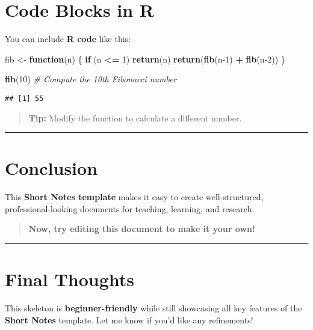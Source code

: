 \documentclass[
  14pt,
  a4paper,
]{extarticle}
\newenvironment{Shaded}{\begin{snugshade}}{\end{snugshade}}
\newcommand{\CommentTok}[1]{\textcolor[rgb]{0.56,0.35,0.01}{\textit{#1}}}
\newcommand{\ControlFlowTok}[1]{\textcolor[rgb]{0.13,0.29,0.53}{\textbf{#1}}}
\newcommand{\DecValTok}[1]{\textcolor[rgb]{0.00,0.00,0.81}{#1}}
\newcommand{\FunctionTok}[1]{\textcolor[rgb]{0.13,0.29,0.53}{\textbf{#1}}}
\newcommand{\NormalTok}[1]{#1}
\newcommand{\OtherTok}[1]{\textcolor[rgb]{0.56,0.35,0.01}{#1}}
\newcommand{\SpecialCharTok}[1]{\textcolor[rgb]{0.81,0.36,0.00}{\textbf{#1}}}
\begin{document}
\section{\texorpdfstring{ \textbf{Code Blocks in
R}}{ Code Blocks in R}}\label{code-blocks-in-r}

You can include \textbf{R code} like this:

\begin{Shaded}
\begin{Highlighting}[]
\NormalTok{fib }\OtherTok{\textless{}{-}} \ControlFlowTok{function}\NormalTok{(n) \{}
  \ControlFlowTok{if}\NormalTok{ (n }\SpecialCharTok{\textless{}=} \DecValTok{1}\NormalTok{) }\FunctionTok{return}\NormalTok{(n)}
  \FunctionTok{return}\NormalTok{(}\FunctionTok{fib}\NormalTok{(n}\DecValTok{{-}1}\NormalTok{) }\SpecialCharTok{+} \FunctionTok{fib}\NormalTok{(n}\DecValTok{{-}2}\NormalTok{))}
\NormalTok{\}}

\FunctionTok{fib}\NormalTok{(}\DecValTok{10}\NormalTok{) }\CommentTok{\# Compute the 10th Fibonacci number}
\end{Highlighting}
\end{Shaded}

\begin{verbatim}
## [1] 55
\end{verbatim}

\begin{quote}
 \textbf{Tip:} Modify the function to calculate a
different number.
\end{quote}

\begin{center}\rule{0.5\linewidth}{0.5pt}\end{center}

\section{\texorpdfstring{
\textbf{Conclusion}}{ Conclusion}}\label{conclusion}

This \textbf{Short Notes template} makes it easy to create
well-structured, professional-looking documents for teaching, learning,
and research. 

\begin{quote}
 \textbf{Now, try editing this document to make it
your own!}
\end{quote}

\begin{center}\rule{0.5\linewidth}{0.5pt}\end{center}

\section{\texorpdfstring{ \textbf{Final
Thoughts}}{ Final Thoughts}}\label{final-thoughts}

This skeleton is \textbf{beginner-friendly} while still showcasing all
key features of the \textbf{Short Notes} template. Let me know if you'd
like any refinements! 
\end{document}
